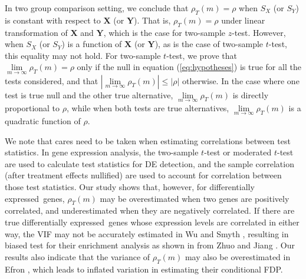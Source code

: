 \documentclass[review]{elsarticle}
\newcommand{\DED}{differentially expressed}
\begin{document}
In two group comparison setting, we conclude that $\rho_T(m) = \rho$ when $S_X$ (or $S_Y$) is 
constant with respect to $\bm X$ (or $\bm Y$). That is, $\rho_T(m) = \rho$ under linear 
transformation of $\bm X$ and $\bm Y$, which is the case for two-sample $z$-test. However, when 
$S_X$ (or $S_Y$) is a function of $\bm X$ (or $\bm Y$), as is the case of two-sample $t$-test, 
this 
equality may not hold. For two-sample $t$-test, we prove that 
$\lim\limits_{m\rightarrow\infty}\rho_T(m)=\rho$ only if the null in equation 
(\ref{eq:hypotheses}) 
is true for all the tests 
considered, and that $|\lim\limits_{m\rightarrow\infty}\rho_T(m)|\leq |\rho|$ otherwise. In the 
case where one test is true null 
and the other true alternative, $\lim\limits_{m\rightarrow\infty}\rho_T(m)$ is directly 
proportional to $\rho$, while when both 
tests are true alternatives, $\lim\limits_{m\rightarrow\infty}\rho_T(m)$ is a quadratic 
function of 
$\rho$.

We note that cares need to be taken when estimating correlations between test statistics.
In gene expression analysis, the two-sample $t$-test \cite{barry2008statistical, efron2007correlation,qiu2005correlation} or moderated 
$t$-test \cite{wu2012camera} are used to calculate test statistics for DE detection, and the 
sample correlation (after treatment effects 
nullified) are used to account for correlation between those test statistics.
Our study shows that, however, for \DED~genes, $\rho_T(m)$ may be 
overestimated when two genes are positively correlated, and underestimated when they are negatively correlated. If 
there are true \DED~genes whose expression 
levels are correlated in either way, the VIF may not be accurately estimated in 
Wu and Smyth \cite{wu2012camera}, resulting in biased test
for their enrichment analysis as shown in from Zhuo and Jiang \cite{zhuo2017meaca}. Our results also indicate 
that the variance of 
$\rho_T(m)$ may also be overestimated in
Efron \cite{efron2007correlation}, which leads to inflated variation in estimating their conditional 
FDP.
\end{document}
